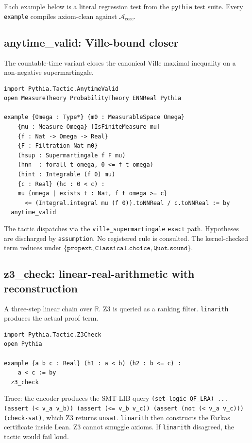 Each example below is a literal regression test from the
\texttt{pythia} test suite. Every \texttt{example} compiles
axiom-clean against $\mathcal{A}_{\text{core}}$.

\subsection{anytime\_valid: Ville-bound closer}
\label{sec:appendix-worked-av}

The countable-time variant closes the canonical Ville maximal
inequality on a non-negative supermartingale.

\begin{lstlisting}
import Pythia.Tactic.AnytimeValid
open MeasureTheory ProbabilityTheory ENNReal Pythia

example {Omega : Type*} {m0 : MeasurableSpace Omega}
    {mu : Measure Omega} [IsFiniteMeasure mu]
    {f : Nat -> Omega -> Real}
    {F : Filtration Nat m0}
    (hsup : Supermartingale f F mu)
    (hnn  : forall t omega, 0 <= f t omega)
    (hint : Integrable (f 0) mu)
    {c : Real} (hc : 0 < c) :
    mu {omega | exists t : Nat, f t omega >= c}
      <= (Integral.integral mu (f 0)).toNNReal / c.toNNReal := by
  anytime_valid
\end{lstlisting}

The tactic dispatches via the
\texttt{ville\_supermartingale} \texttt{exact} path. Hypotheses are
discharged by \texttt{assumption}. No registered rule is consulted.
The kernel-checked term reduces under
$\{\texttt{propext}, \texttt{Classical.choice}, \texttt{Quot.sound}\}$.

\subsection{z3\_check: linear-real-arithmetic with reconstruction}
\label{sec:appendix-worked-z3}

A three-step linear chain over $\mathbb{R}$. Z3 is queried as a
ranking filter. \texttt{linarith} produces the actual proof term.

\begin{lstlisting}
import Pythia.Tactic.Z3Check
open Pythia

example {a b c : Real} (h1 : a < b) (h2 : b <= c) :
    a < c := by
  z3_check
\end{lstlisting}

Trace: the encoder produces the SMT-LIB query
\texttt{(set-logic QF\_LRA) ... (assert (< v\_a v\_b)) (assert
(<= v\_b v\_c)) (assert (not (< v\_a v\_c))) (check-sat)}, which Z3
returns \texttt{unsat}. \texttt{linarith} then constructs the
Farkas certificate inside Lean. Z3 cannot smuggle axioms. If
\texttt{linarith} disagreed, the tactic would fail loud.

